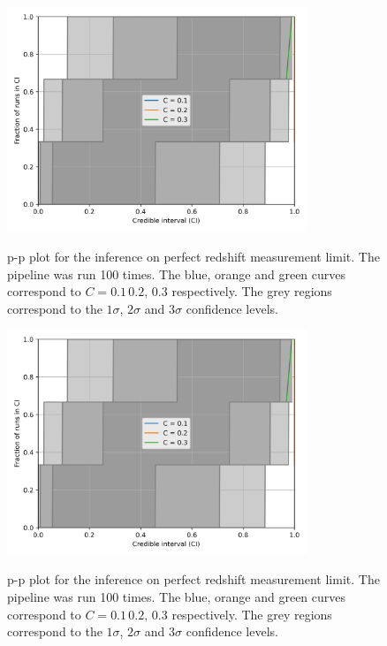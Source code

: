 \documentclass[%
preprint,
nofootinbib,
 amsmath,amssymb,
 aps,
]{revtex4-2}
\begin{document}
\newpage

\begin{figure}[!ht]
	\caption{p-p plot for the inference on perfect redshift measurement limit. The pipeline was run 100 times.
		The blue, orange and green curves correspond to $C=0.1 \, 0.2, \, 0.3$ respectively.
		The grey regions correspond to the $1\sigma$, $2\sigma$ and $3\sigma$ confidence levels.}
	\includegraphics[width=0.8\textwidth]{../src/figures/pp_analysis-perfect-redshift.png}
	\label{fig:pp-analysis-perfect-redshift}
\end{figure}

\begin{figure}[!ht]
	\caption{p-p plot for the inference on perfect redshift measurement limit. The pipeline was run 100 times.
		The blue, orange and green curves correspond to $C=0.1 \, 0.2, \, 0.3$ respectively.
		The grey regions correspond to the $1\sigma$, $2\sigma$ and $3\sigma$ confidence levels.}
	\includegraphics[width=0.8\textwidth]{../src/figures/pp_analysis-perfect-redshift.png}
	\label{fig:pp-analysis-full-inference}
\end{figure}
\end{document}
